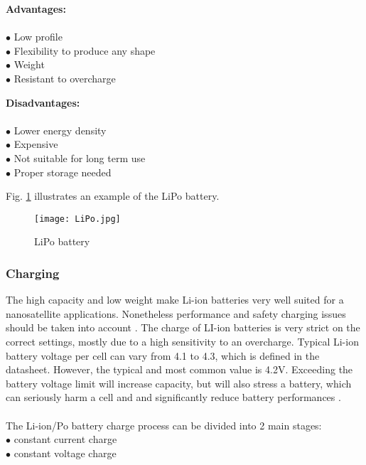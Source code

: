 \begin{multicols}{2}
	
	\textbf{Advantages:} \\ \\
	$\bullet$ Low profile \\
	$\bullet$ Flexibility to produce any shape\\
	$\bullet$ Weight\\
	$\bullet$ Resistant to overcharge\\
	
	
	
	
	\columnbreak
	
	\textbf{Disadvantages:} \\ \\
	$\bullet$ Lower energy density\\
	$\bullet$ Expensive\\
	$\bullet$ Not suitable for long term use\\
	$\bullet$ Proper storage needed 
	
	
	
\end{multicols}

Fig. \ref{fig: lipo} illustrates an example of the LiPo battery. 

\begin{figure}[h]
	\centering
	\texttt{[image: LiPo.jpg]}
	\caption{ LiPo battery \cite{12}}
	\label{fig: lipo}
\end{figure}



\subsubsection{Charging}

\cite{13}The high capacity and low weight make Li-ion batteries very well suited for a nanosatellite applications. Nonetheless performance and safety charging issues should be taken into account \cite{13}. The charge of LI-ion batteries is very strict on the correct settings, mostly due to a high sensitivity to an overcharge. Typical Li-ion battery voltage per cell can vary from 4.1 to 4.3, which is defined in the datasheet. However, the typical and most common value is 4.2V. Exceeding the battery voltage limit will increase capacity, but will also stress a battery, which can seriously harm a cell and and significantly reduce battery performances \cite{14}.\\ \\
The Li-ion/Po battery charge process can be divided into 2 main stages:\\
$\bullet$ constant current charge\\
$\bullet$ constant voltage charge\\

